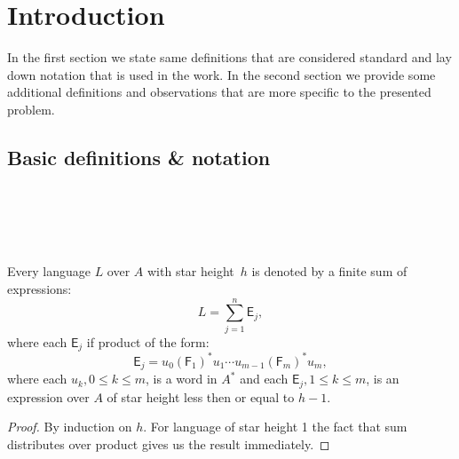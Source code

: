 \chapter{Introduction}

In the first section we state same definitions that are considered standard and lay down notation that is used in the work. In the second section we provide some additional definitions and observations that are more specific to the presented problem.

\section{Basic definitions \& notation}

\begin{defn} \\
    \\
\end{defn}

\begin{defn} \\
\end{defn}

\begin{defn}
\end{defn}

\begin{lemma}\label{lm:distributivity}
    Every language $L$ over $A$ with star height~$h$ is denoted by a finite sum of expressions:
    \[
        L = \sum_{j=1}^n \mathsf{E}_j,
    \]
    where each $\mathsf{E}_j$ if product of the form:
    \[
        \mathsf{E}_j = u_0{(\mathsf{F}_1)}^*u_1 \dotsm u_{m-1}{(\mathsf{F}_m)}^*u_m,
    \]
    where each $u_k, 0 \leq k \leq m$, is a word in $A^*$ and each $\mathsf{E}_j, 1 \leq k \leq m$, is an expression over $A$ of star height less then or equal to $h-1$.
\end{lemma}

\begin{proof}
    By induction on $h$. For language of star height 1 the fact that sum distributes over product gives us the result immediately. 
\end{proof}

\begin{lemma}\label{lm:block_star_lemma} \\
\end{lemma}


